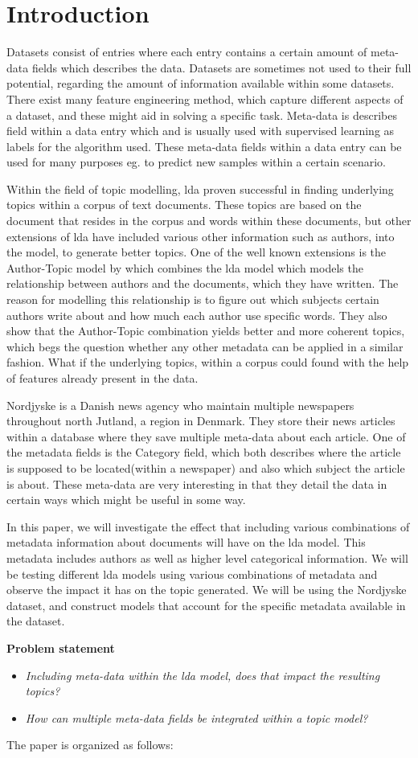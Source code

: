 \section{Introduction}\label{sec:introduction}
Datasets consist of entries where each entry contains a certain amount of meta-data fields which describes the data.
Datasets are sometimes not used to their full potential, regarding the amount of information available within some datasets.
There exist many feature engineering method, which capture different aspects of a dataset, and these might aid in solving a specific task.
Meta-data is describes field within a data entry which and is usually used with supervised learning as labels for the algorithm used.
These meta-data fields within a data entry can be used for many purposes eg. to predict new samples within a certain scenario.

Within the field of topic modelling, \Gls{lda} proven successful in finding underlying topics within a corpus of text documents.
These topics are based on the document that resides in the corpus and words within these documents, but other extensions of \gls{lda} have included various other information such as authors, into the model, to generate better topics.
One of the well known extensions is the Author-Topic model by \citet{author_topic} which combines the \gls{lda} model which models the relationship between authors and the documents, which they have written.
The reason for modelling this relationship is to figure out which subjects certain authors write about and how much each author use specific words. 
They also show that the Author-Topic combination yields better and more coherent topics, which begs the question whether any other metadata can be applied in a similar fashion.
What if the underlying topics, within a corpus could found with the help of features already present in the data.

Nordjyske is a Danish news agency who maintain multiple newspapers throughout north Jutland, a region in Denmark.
They store their news articles within a database where they save multiple meta-data about each article.
One of the metadata fields is the Category field, which both describes where the article is supposed to be located(within a newspaper) and also which subject the article is about. 
These meta-data are very interesting in that they detail the data in certain ways which might be useful in some way.

In this paper, we will investigate the effect that including various combinations of metadata information about documents will have on the \gls{lda} model.
This metadata includes authors as well as higher level categorical information.
We will be testing different \gls{lda} models using various combinations of metadata and observe the impact it has on the topic generated.
We will be using the Nordjyske dataset, and construct models that account for the specific metadata available in the dataset.

\textbf{Problem statement}
\begin{itemize}
	\item \textit{Including meta-data within the \gls{lda} model, does that impact the resulting topics?}
	\item \textit{How can multiple meta-data fields be integrated within a topic model?}
\end{itemize}
	
The paper is organized as follows: 